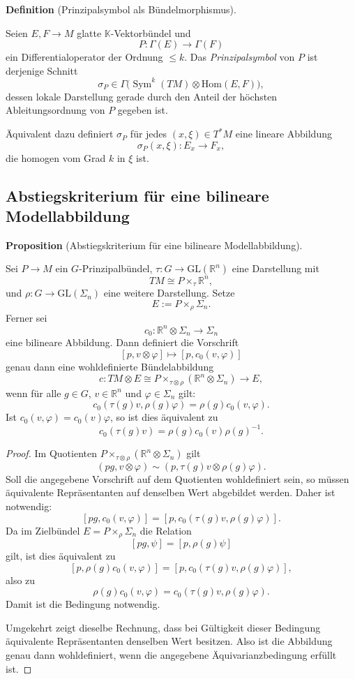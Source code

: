 \documentclass[10pt, letterpaper]{article}
\newcommand{\R}{\mathbb{R}}
\newcommand{\Hom}{\mathrm{Hom}}
\newcommand{\GL}{\mathrm{GL}}
\newcommand{\CustomHeading}[3]{%
  \par\medskip\noindent%
  \textbf{#1 #2} \textnormal{(#3)}.\enskip%
}
\newenvironment{DEF}[2]{\CustomHeading{Definition}{#1}{#2}}{}
\newenvironment{PROP}[2]{\CustomHeading{Proposition}{#1}{#2}}{}
\begin{document}
\begin{DEF}{}{Prinzipalsymbol als Bündelmorphismus}
Seien \(E,F\to M\) glatte \(\mathbb{K}\)-Vektorbündel und
\[
P:\Gamma(E)\to \Gamma(F)
\]
ein Differentialoperator der Ordnung \(\le k\). Das \emph{Prinzipalsymbol} von \(P\)
ist derjenige Schnitt
\[
\sigma_P\in \Gamma\bigl(\operatorname{Sym}^k(TM)\otimes \Hom(E,F)\bigr),
\]
dessen lokale Darstellung gerade durch den Anteil der höchsten Ableitungsordnung
von \(P\) gegeben ist.

Äquivalent dazu definiert \(\sigma_P\) für jedes \((x,\xi)\in T^*M\) eine lineare
Abbildung
\[
\sigma_P(x,\xi):E_x\to F_x,
\]
die homogen vom Grad \(k\) in \(\xi\) ist.
\end{DEF}


\pagebreak

\subsection{Abstiegskriterium für eine bilineare Modellabbildung}

\begin{PROP}{}{Abstiegskriterium für eine bilineare Modellabbildung}
Sei \(P\to M\) ein \(G\)-Prinzipalbündel, \(\tau:G\to \GL(\R^n)\) eine Darstellung mit
\[
TM\cong P\times_\tau \R^n,
\]
und \(\rho:G\to \GL(\Sigma_n)\) eine weitere Darstellung. Setze
\[
E:=P\times_\rho \Sigma_n.
\]
Ferner sei
\[
c_0:\R^n\otimes \Sigma_n\to \Sigma_n
\]
eine bilineare Abbildung. Dann definiert die Vorschrift
\[
[p,v\otimes \varphi]\longmapsto [p,c_0(v,\varphi)]
\]
genau dann eine wohldefinierte Bündelabbildung
\[
c:TM\otimes E \cong P\times_{\tau\otimes \rho}(\R^n\otimes \Sigma_n)\to E,
\]
wenn für alle \(g\in G\), \(v\in \R^n\) und \(\varphi\in \Sigma_n\) gilt:
\[
c_0(\tau(g)v,\rho(g)\varphi)=\rho(g)c_0(v,\varphi).
\]
Ist \(c_0(v,\varphi)=c_0(v)\varphi\), so ist dies äquivalent zu
\[
c_0(\tau(g)v)=\rho(g)c_0(v)\rho(g)^{-1}.
\]
\end{PROP}

\begin{proof}
Im Quotienten \(P\times_{\tau\otimes\rho}(\R^n\otimes \Sigma_n)\) gilt
\[
(pg,v\otimes \varphi)\sim (p,\tau(g)v\otimes \rho(g)\varphi).
\]
Soll die angegebene Vorschrift auf dem Quotienten wohldefiniert sein, so müssen äquivalente Repräsentanten auf denselben Wert abgebildet werden. Daher ist notwendig:
\[
[pg,c_0(v,\varphi)]=[p,c_0(\tau(g)v,\rho(g)\varphi)].
\]
Da im Zielbündel \(E=P\times_\rho \Sigma_n\) die Relation
\[
[pg,\psi]=[p,\rho(g)\psi]
\]
gilt, ist dies äquivalent zu
\[
[p,\rho(g)c_0(v,\varphi)]=[p,c_0(\tau(g)v,\rho(g)\varphi)],
\]
also zu
\[
\rho(g)c_0(v,\varphi)=c_0(\tau(g)v,\rho(g)\varphi).
\]
Damit ist die Bedingung notwendig.

Umgekehrt zeigt dieselbe Rechnung, dass bei Gültigkeit dieser Bedingung äquivalente Repräsentanten denselben Wert besitzen. Also ist die Abbildung genau dann wohldefiniert, wenn die angegebene Äquivarianzbedingung erfüllt ist.
\end{proof}
\end{document}
